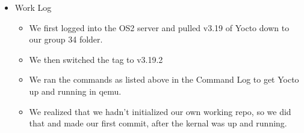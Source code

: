 \documentclass[titlepage,draftclsnofoot,onecolumn]{article}
\begin{document}
\begin{itemize}
{  }
  \item Work Log
  \begin{itemize}
    \item We first logged into the OS2 server and pulled v3.19 of Yocto down to our group 34 folder.
    \item We then switched the tag to v3.19.2
    \item We ran the commands as listed above in the Command Log to get Yocto up and running in qemu.
    \item We realized that we hadn't initialized our own working repo, so we did that and made our first commit, after the kernal was up and running.
  \end{itemize}

\end{itemize}
\end{document}
